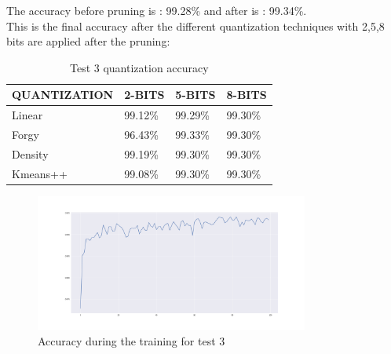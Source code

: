 \documentclass[journal]{vgtc}                %
\begin{document}
The accuracy before pruning is : 99.28\% and after is : 99.34\%.\\This is the final accuracy after the different quantization techniques with 2,5,8 bits are applied after the pruning:
\begin{table}[H]
\caption{Test 3 quantization accuracy}
\label{my-label}
\begin{tabular}{|l|l|l|l|}
\hline
QUANTIZATION & 2-BITS  & 5-BITS  & 8-BITS  \\ \hline
Linear       & 99.12\% & 99.29\% & 99.30\% \\ \hline
Forgy        & 96.43\% & 99.33\% & 99.30\% \\ \hline
Density       & 99.19\% & 99.30\% & 99.30\% \\ \hline
Kmeans++     & 99.08\% & 99.30\% & 99.30\% \\ \hline
\end{tabular}
\end{table}\begin{figure}[H]
	\hspace*{-1cm}
	\includegraphics[width=90mm,scale=0.7]{accuracy-soft-threshold-conv}
	\caption{Accuracy during the training for test 3}
\end{figure}
\end{document}

